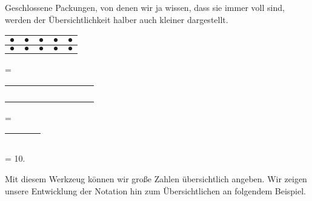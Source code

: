 \documentclass[a4paper]{amsart}
\theoremstyle{definition}
\begin{document}
Geschlossene Packungen, von denen wir ja wissen, dass sie immer voll sind, werden der Übersichtlichkeit halber auch kleiner dargestellt.

\begin{tabular}{|c|c|c|c|c|}
   \hline
   $\bullet$&$\bullet$&$\bullet$&$\bullet$&$\bullet$\\
   \hline
   $\bullet$&$\bullet$&$\bullet$&$\bullet$&$\bullet$\\
   \hline
\end{tabular} = 

\begin{tabular}{|ccccc|}
   \hline
   $\phantom\bullet$&$\phantom\bullet$&$\phantom\bullet$&$\phantom\bullet$&$\phantom\bullet$\\
   $\phantom\bullet$&$\phantom\bullet$&$\phantom\bullet$&$\phantom\bullet$&$\phantom\bullet$\\
   \hline
\end{tabular} =

\begin{tabular}{|cc|}
   \hline
   $\phantom\bullet$&$\phantom\bullet$\\
   \hline
\end{tabular} = 10.

Mit diesem Werkzeug können wir große Zahlen übersichtlich angeben. Wir zeigen unsere Entwicklung der Notation hin zum Übersichtlichen an folgendem Beispiel.
\end{document}
